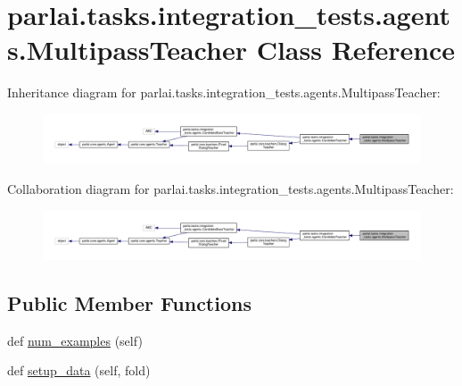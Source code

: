 \hypertarget{classparlai_1_1tasks_1_1integration__tests_1_1agents_1_1MultipassTeacher}{}\section{parlai.\+tasks.\+integration\+\_\+tests.\+agents.\+Multipass\+Teacher Class Reference}
\label{classparlai_1_1tasks_1_1integration__tests_1_1agents_1_1MultipassTeacher}


Inheritance diagram for parlai.\+tasks.\+integration\+\_\+tests.\+agents.\+Multipass\+Teacher\+:
\nopagebreak
\begin{figure}[H]
\begin{center}
\leavevmode
\includegraphics[width=350pt]{d1/d90/classparlai_1_1tasks_1_1integration__tests_1_1agents_1_1MultipassTeacher__inherit__graph}
\end{center}
\end{figure}


Collaboration diagram for parlai.\+tasks.\+integration\+\_\+tests.\+agents.\+Multipass\+Teacher\+:
\nopagebreak
\begin{figure}[H]
\begin{center}
\leavevmode
\includegraphics[width=350pt]{da/d6a/classparlai_1_1tasks_1_1integration__tests_1_1agents_1_1MultipassTeacher__coll__graph}
\end{center}
\end{figure}
\subsection*{Public Member Functions}
\begin{DoxyCompactItemize}
\item 
def \hyperlink{classparlai_1_1tasks_1_1integration__tests_1_1agents_1_1MultipassTeacher_ae940c091daf534981c1cb5f42e38e8b2}{num\+\_\+examples} (self)
\item 
def \hyperlink{classparlai_1_1tasks_1_1integration__tests_1_1agents_1_1MultipassTeacher_a8f00304abda0184bc641db17143a6204}{setup\+\_\+data} (self, fold)
\end{DoxyCompactItemize}
